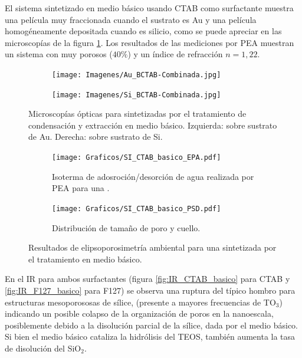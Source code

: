 {		El sistema sintetizado en medio básico usando CTAB como surfactante muestra una película muy fraccionada cuando el sustrato es Au y una película homogéneamente depositada cuando es silicio, como se puede apreciar en las microscopías de la figura \ref{fig:Microscopia_CTAB_basico}. Los resultados de las mediciones por PEA muestran un sistema con muy porosos ($40\%$) y un índice de refracción $n=1,22$.
			
		\begin{figure}[!th]
 	   	    \begin{subfigure}[t]{0.49\textwidth}
	       	\texttt{[image: Imagenes/Au\_BCTAB-Combinada.jpg]}
	   		\end{subfigure}
	   		\begin{subfigure}[t]{0.49\textwidth}
	   	    \texttt{[image: Imagenes/Si\_BCTAB-Combinada.jpg]}
	   		\end{subfigure}
			 \caption[Microscopía óptica \pdmC tratamiento en medio básico.]{Microscopías ópticas para \pdmC\space sintetizadas por el tratamiento de condensación y extracción en medio básico. Izquierda: sobre sustrato de Au. Derecha: sobre sustrato de Si.}
			 \label{fig:Microscopia_CTAB_basico}	
		     \end{figure}		

		\begin{figure}[!ht]
		  	\begin{subfigure}[t]{0.495\textwidth}
		  	\texttt{[image: Graficos/SI\_CTAB\_basico\_EPA.pdf]}
			\caption[Elipsoporsimetría \pdmC\space tratamiento básico.]{Isoterma de adosroción/desorción de agua realizada por PEA para una \pdmC.}
			\label{fig:CTAB_basico_EPA}
			\end{subfigure}
			\begin{subfigure}[t]{0.495\textwidth}
		  	\texttt{[image: Graficos/SI\_CTAB\_basico\_PSD.pdf]}
			\caption{Distribución de tamaño de poro y cuello.\\ }
			\label{fig:CTAB_basico_PSD}
			\end{subfigure}
			\caption[Elipsoporosimetría \pdmC\space tratamiento básico.]{Resultados de elipsoporosimetría ambiental para una \pdmC\space sintetizada por el tratamiento en medio básico.}
			\end{figure}

		En el IR para ambos surfactantes (figura \ref{fig:IR_CTAB_basico} para CTAB y \ref{fig:IR_F127_basico} para F127) se observa una ruptura del típico hombro para estructuras mesoporososas de sílice\cite{Olsen1989,Innocenzi2003,Angelome2008}, (presente a mayores frecuencias de TO$_3$) indicando un posible colapso de la organización de poros en la nanoescala, posiblemente debido a la disolución parcial de la sílice, dada por el medio básico. Si bien el medio básico cataliza la hidrólisis del TEOS, también aumenta la tasa de disolución del SiO$_2$.\cite{Mazer1994,Niibori2000,Gorrepati2010}

}
